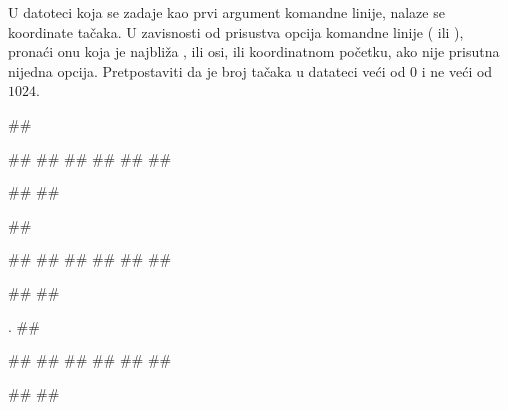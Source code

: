 \begin{Answer}[ref=404]
\end{Answer}
\begin{Exercise}[label=405]
  U datoteci koja se zadaje kao prvi argument komandne linije, nalaze
  se koordinate tačaka. U zavisnosti od prisustva opcija komandne
  linije ( ili ), pronaći onu koja je najbliža
  , ili  osi, ili koordinatnom početku, ako nije
  prisutna nijedna opcija. Pretpostaviti da je broj tačaka u datateci
  veći od $0$ i ne veći od $1024$.
  
\begin{minitest}
\begin{test}{1}
##

##
##
##
##
##
##

#\naslovIzlaz#
##
\end{test}
\end{minitest}
\begin{minitest}
\begin{test}{2}
##
  
##
##
##
##
##
##

#\naslovIzlaz#
##
\end{test}
\end{minitest}
\begin{minitest}
\begin{test}{3}.
##

##
##
##
##
##
##
  
#\naslovIzlaz#
##
\end{test}
\end{minitest}


\end{Exercise}

